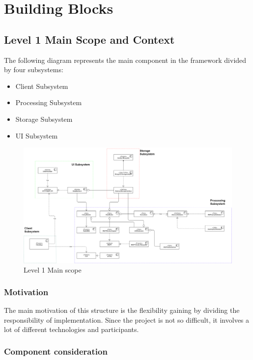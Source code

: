 \section{Building Blocks}\label{building-blocks}

\subsection{Level 1 Main Scope and
Context}\label{level-1-main-scope-and-context}

The following diagram represents the main component in the framework
divided by four subsystems:

\begin{itemize}
\tightlist
\item
  Client Subsystem
\item
  Processing Subsystem
\item
  Storage Subsystem
\item
  UI Subsystem
\end{itemize}

\begin{figure}[!h]
	\centering
	\includegraphics[width=\linewidth]{schemes/classes/ClassDiagram_overview.png}
\caption{Level 1 Main scope}
\end{figure}

\subsubsection{Motivation}\label{motivation}

The main motivation of this structure is the flexibility gaining by
dividing the responsibility of implementation. Since the project is not
so difficult, it involves a lot of different technologies and
participants.

\subsubsection{Component consideration}\label{component-consideration}

